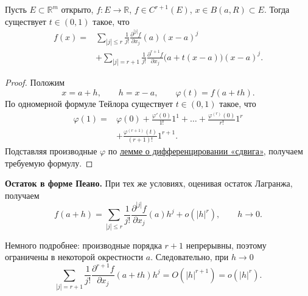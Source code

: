\label{ticket:04}

\begin{theorem}
Пусть $E\subset\mathbb R^m$ открыто, $f\colon E\to\mathbb R$,
$f\in C^{r+1}(E)$, $x\in B(a,R)\subset E$.
Тогда существует $t\in(0,1)$ такое, что
\[
  \begin{aligned}
    f(x)={}&\sum_{|j|\le r}\frac{1}{j!}
      \frac{\partial^{|j|}f}{\partial x_j}(a)(x-a)^j\\
    &+\sum_{|j|=r+1}\frac{1}{j!}
      \frac{\partial^{r+1}f}{\partial x_j}\bigl(a+t(x-a)\bigr)(x-a)^j.
  \end{aligned}
\]
\end{theorem}

\begin{proof}
Положим
\[
  x=a+h,\qquad h=x-a,\qquad \varphi(t)=f(a+th).
\]
По одномерной формуле Тейлора существует $t\in(0,1)$ такое, что
\[
  \begin{aligned}
    \varphi(1)={}&\varphi(0)+\frac{\varphi'(0)}{1!}1^1+\ldots
      +\frac{\varphi^{(r)}(0)}{r!}1^r\\
    &+\frac{\varphi^{(r+1)}(t)}{(r+1)!}1^{r+1}.
  \end{aligned}
\]
Подставляя производные $\varphi$ по
\hyperref[ticket:03]{лемме о дифференцировании «сдвига»}, получаем требуемую формулу.
\end{proof}

\textbf{Остаток в форме Пеано.}
При тех же условиях, оценивая остаток Лагранжа, получаем
\[
  f(a+h)=\sum_{|j|\le r}\frac{1}{j!}
    \frac{\partial^{|j|}f}{\partial x_j}(a)h^j
    +o(|h|^r),\qquad h\to0.
\]

Немного подробнее: производные порядка $r+1$ непрерывны,
поэтому ограничены в некоторой окрестности $a$.
Следовательно, при $h\to0$
\[
  \sum_{|j|=r+1}\frac{1}{j!}
    \frac{\partial^{r+1}f}{\partial x_j}(a+th)h^j
  =O(|h|^{r+1})=o(|h|^r).
\]
